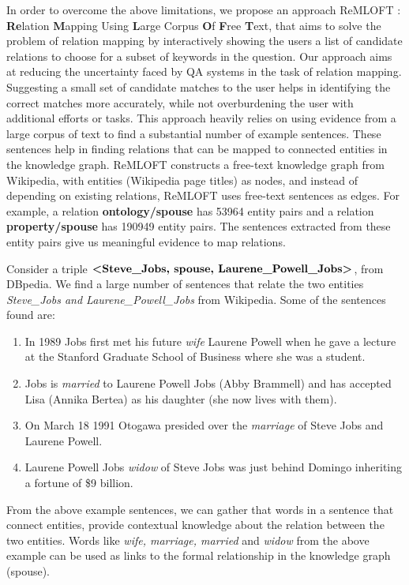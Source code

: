 \begin{sloppypar}
In order to overcome the above limitations, we propose an approach ReMLOFT : \textbf{Re}lation \textbf{M}apping Using \textbf{L}arge Corpus \textbf{O}f \textbf{F}ree \textbf{T}ext, that aims to solve the problem of relation mapping by interactively showing the users a list of candidate relations to choose for a subset of keywords in the question. Our approach aims at reducing the uncertainty faced by QA systems in the task of relation mapping. Suggesting a small set of candidate matches to the user helps in identifying the correct matches more accurately, while not overburdening the user with additional efforts or tasks. This approach heavily relies on using evidence from a large corpus of text to find a substantial number of example sentences. These sentences help in finding relations that can be mapped to connected entities in the knowledge graph. ReMLOFT constructs a free-text knowledge graph from Wikipedia, with entities (Wikipedia page titles) as nodes, and instead of depending on existing relations, ReMLOFT uses free-text sentences as edges. For example, a relation \textbf{ontology/spouse} has 53964 entity pairs and a relation \textbf{property/spouse} has 190949 entity pairs. The sentences extracted from these entity pairs give us meaningful evidence to map relations. 

Consider a triple $\textbf{\textless Steve\_Jobs, spouse,  Laurene\_Powell\_Jobs\textgreater}$, from DBpedia. We find a large number of sentences that relate the two entities \textit{
Steve\_Jobs and Laurene\_Powell\_Jobs } from Wikipedia.  Some of the sentences found are:
{\selectfont
\begin{enumerate}
    \item In 1989 Jobs first met his future \textit{wife} Laurene Powell when he gave a lecture at the Stanford Graduate School of Business where she was a student.
    \item Jobs is \textit{married} to Laurene Powell Jobs (Abby Brammell) and has accepted Lisa (Annika Bertea) as his daughter (she now lives with them).
    \item On March 18 1991 Otogawa presided over the \textit{marriage} of Steve Jobs and Laurene Powell.
    \item Laurene Powell Jobs \textit{widow} of Steve Jobs was just behind Domingo inheriting a fortune of \$9 billion.
\end{enumerate}
}
From the above example sentences, we can gather that words in a sentence that connect entities, provide contextual knowledge about the relation between the two entities. Words like \textit{wife, marriage, married} and \textit{widow} from the above example can be used as links to the formal relationship in the knowledge graph (spouse).


\end{sloppypar}
